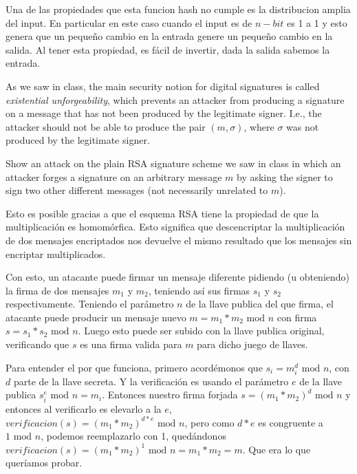 \documentclass[12pt,addpoints,answers]{exam}
\begin{document}
\begin{questions}
\begin{solution} %
Una de las propiedades que esta funcion hash no cumple es la distribucion amplia
del input.
En particular en este caso cuando el input es de $n-bit$ es 1 a 1 y esto genera
que un pequeño cambio en la entrada genere un pequeño cambio en la salida.
Al tener esta propiedad, es fácil de invertir, dada la salida sabemos la entrada.
\end{solution}

\newpage

\question[10] As we saw in class, the main security notion for digital signatures is called {\em existential unforgeability}, which prevents an attacker from producing a signature on a message that has not been produced by the legitimate signer. I.e., the attacker should not be able to produce the pair $(m, \sigma)$, where $\sigma$ was not produced by the legitimate signer.

Show an attack on the plain RSA signature scheme we saw in class in which an attacker forges a signature on an arbitrary message $m$ by asking the signer to sign two other different messages (not necessarily unrelated to $m$).

\begin{solution} %
Esto es posible gracias a que el esquema RSA tiene la propiedad de que la multiplicación es
homomórfica.
Esto significa que descencriptar la multiplicación de dos mensajes encriptados nos
devuelve el mismo resultado que los mensajes sin encriptar multiplicados.

    Con esto, un atacante puede firmar un mensaje diferente pidiendo (u obteniendo)
la firma de dos mensajes $m_1$ y $m_2$, teniendo así sus firmas $s_1$ y $s_2$ respectivamente.
Teniendo el parámetro $n$ de la llave publica del que firma, el atacante puede producir
un mensaje nuevo  $m = m_1*m_2 \text{ mod }n$ con firma $s = s_1*s_2\text{ mod }n$.
Luego esto puede ser subido con la llave publica original, verificando que $s$ es una
firma valida para $m$ para dicho juego de llaves.

Para entender el por que funciona, primero  acordémonos que $s_i = m_i^d \text{ mod }n$, con $d$ parte
de la llave secreta.
Y la verificación es usando el parámetro $e$ de la llave publica $s_i^e \text{ mod }n = m_i$.
Entonces nuestro firma forjada $s=(m_1*m_2)^d \text{ mod }n$ y entonces al verificarlo es
    elevarlo a la $e$, $verificacion(s)=(m_1*m_2)^{d*e} \text{ mod }n$, pero como $d*e$ es congruente a
    $1\text{ mod }n$, podemos reemplazarlo con 1, quedándonos $verificacion(s)=(m_1*m_2)^{1} \text{ mod }n = m_1*m_2  = m$.
    Que era lo que queríamos probar.
\end{solution}


\end{questions}
\end{document}

